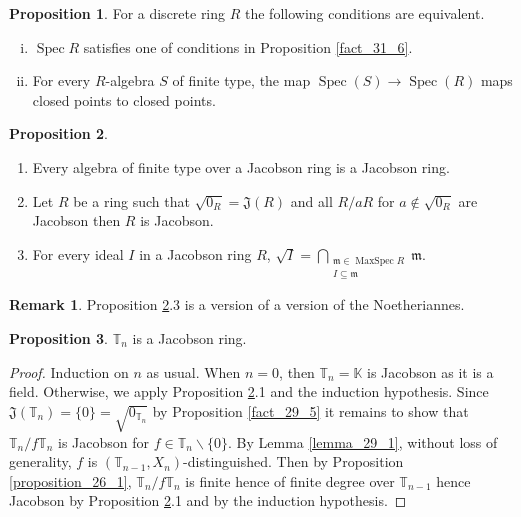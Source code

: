 \documentclass[10pt]{article}
\numberwithin{equation}{section}
\theoremstyle{definition}
\newtheorem{proposition}{Proposition}[subsection]
\newtheorem{remark}{Remark}[subsection]
\DeclareMathOperator{\MaxSpec}{MaxSpec}
\DeclareMathOperator{\Spec}{Spec}
\newcommand{\m}[0]{\mathfrak{m}}
\newcommand{\T}[0]{\mathbb{T}}
\newcommand{\K}[0]{\mathbb{K}}
\begin{document}
\begin{proposition}
    \label{fact_31_7}
    For a discrete ring $R$ the following conditions are equivalent.
    \begin{enumerate}[i.]
        \item $\Spec R$ satisfies one of conditions in Proposition \ref{fact_31_6}.
        \item For every $R$-algebra $S$ of finite type, the map $\Spec(S)\to\Spec(R)$ maps closed points to closed points.
    \end{enumerate}
\end{proposition}

\begin{proposition}$\:$
    \label{fact_31_8}
    \begin{enumerate}[1.]
        \item Every algebra of finite type over a Jacobson ring is a Jacobson ring.
        \item Let $R$ be a ring such that $\sqrt{0_R}=\mathfrak{J}(R)$ and all $R/aR$ for $a\not\in\sqrt{0_R}$ are Jacobson then $R$ is Jacobson.
        \item For every ideal $I$ in a Jacobson ring $R$, $\sqrt{I}=\bigcap_{\substack{\mathfrak{m}\in\MaxSpec R\\ I\subseteq\m}}\mathfrak{m}$.
    \end{enumerate}
\end{proposition}

\begin{remark}
    Proposition \ref{fact_31_8}.3 is a version of a version of the Noetheriannes.
\end{remark}

\begin{proposition}
    \label{proposition_31_3}
    $\T_n$ is a Jacobson ring.
\end{proposition}

\begin{proof}
    Induction on $n$ as usual. When $n=0$, then $\T_n=\K$ is Jacobson as it is a field. Otherwise, we apply Proposition \ref{fact_31_8}.1 and the induction hypothesis. 
    Since $\mathfrak{J}(\T_n) = \{0\}=\sqrt{0_{\T_n}}$ by Proposition \ref{fact_29_5} it remains to show that $\T_n/f\T_n$ is Jacobson for $f\in\T_n\backslash\{0\}$. 
    By Lemma \ref{lemma_29_1}, without loss of generality, $f$ is $(\T_{n-1},X_n)$-distinguished. Then by Proposition \ref{proposition_26_1}, $\T_n/f\T_n$ is finite hence of finite degree over $\T_{n-1}$ hence Jacobson by Proposition \ref{fact_31_8}.1 and by the induction hypothesis.
\end{proof}
\end{document}
